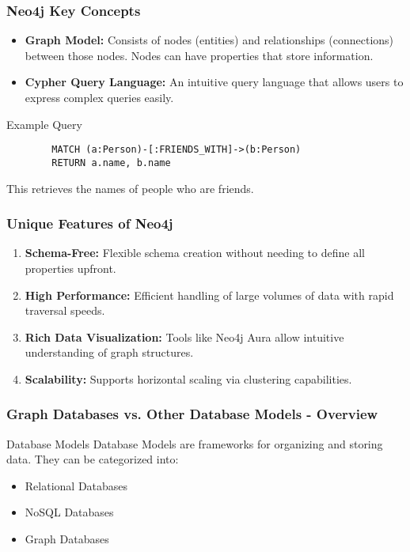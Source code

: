 \documentclass[aspectratio=169]{beamer}
\begin{document}
\begin{frame}[fragile]
    \frametitle{Neo4j Key Concepts}
    \begin{itemize}
        \item \textbf{Graph Model:} Consists of nodes (entities) and relationships (connections) between those nodes. Nodes can have properties that store information.
        \item \textbf{Cypher Query Language:} An intuitive query language that allows users to express complex queries easily.
    \end{itemize}
    \begin{block}{Example Query}
        \begin{lstlisting}
        MATCH (a:Person)-[:FRIENDS_WITH]->(b:Person)
        RETURN a.name, b.name
        \end{lstlisting}
        This retrieves the names of people who are friends.
    \end{block}
\end{frame}

\begin{frame}[fragile]
    \frametitle{Unique Features of Neo4j}
    \begin{enumerate}
        \item \textbf{Schema-Free:} Flexible schema creation without needing to define all properties upfront.
        \item \textbf{High Performance:} Efficient handling of large volumes of data with rapid traversal speeds.
        \item \textbf{Rich Data Visualization:} Tools like Neo4j Aura allow intuitive understanding of graph structures.
        \item \textbf{Scalability:} Supports horizontal scaling via clustering capabilities.
    \end{enumerate}
\end{frame}

\begin{frame}[fragile]
    \frametitle{Graph Databases vs. Other Database Models - Overview}
    \begin{block}{Database Models}
        Database Models are frameworks for organizing and storing data. They can be categorized into:
        \begin{itemize}
            \item Relational Databases
            \item NoSQL Databases
            \item Graph Databases
        \end{itemize}
    \end{block}
\end{frame}
\end{document}
